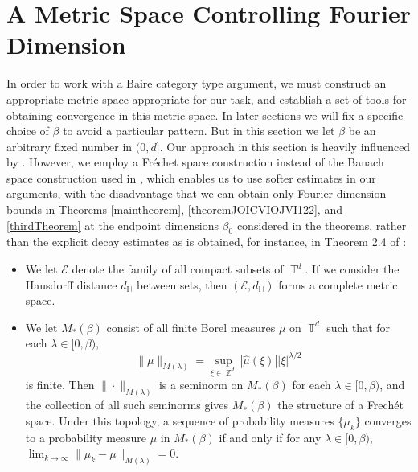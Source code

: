 \documentclass[dvipsnames,letterpaper,12pt]{article}
\numberwithin{equation}{section}
\DeclareMathOperator{\ZZ}{\mathbb{Z}}
\DeclareMathOperator{\TT}{\mathbb{T}}
\numberwithin{theorem}{section}
\begin{document}
\section{A Metric Space Controlling Fourier Dimension}

In order to work with a Baire category type argument, we must construct an appropriate metric space appropriate for our task, and establish a set of tools for obtaining convergence in this metric space. In later sections we will fix a specific choice of $\beta$ to avoid a particular pattern. But in this section we let $\beta$ be an arbitrary fixed number in $(0,d]$. Our approach in this section is heavily influenced by \cite{Korner2}. However, we employ a Fr\'{e}chet space construction instead of the Banach space construction used in \cite{Korner2}, which enables us to use softer estimates in our arguments, with the disadvantage that we can obtain only Fourier dimension bounds in Theorems \ref{maintheorem}, \ref{theoremJOICVIOJVI122}, and \ref{thirdTheorem} at the endpoint dimensions $\beta_0$ considered in the theorems, rather than the explicit decay estimates as is obtained, for instance, in Theorem 2.4 of \cite{Korner2}:
%
\begin{itemize}
    \item We let $\mathcal{E}$ denote the family of all compact subsets of $\TT^d$. If we consider the Hausdorff distance $d_{\mathbb{H}}$ between sets, then $(\mathcal{E},d_\mathbb{H})$ forms a complete metric space. %

    \item We let $M_*(\beta)$ consist of all finite Borel measures $\mu$ on $\TT^d$ such that for each $\lambda \in [0,\beta)$,
    \[ \| \mu \|_{M(\lambda)} = \sup_{\xi \in \ZZ^d} |\widehat{\mu}(\xi)| |\xi|^{\lambda/2} \]
    is finite. Then $\| \cdot \|_{M(\lambda)}$ is a seminorm on $M_*(\beta)$ for each $\lambda \in [0,\beta)$, and the collection of all such seminorms gives $M_*(\beta)$ the structure of a Frech\'{e}t space. Under this topology, a sequence of probability measures $\{ \mu_k \}$ converges to a probability measure $\mu$ in $M_*(\beta)$ if and only if for any $\lambda \in [0,\beta)$, $\lim_{k \to \infty} \| \mu_k - \mu \|_{M(\lambda)} = 0$.
\end{itemize}
\end{document}
